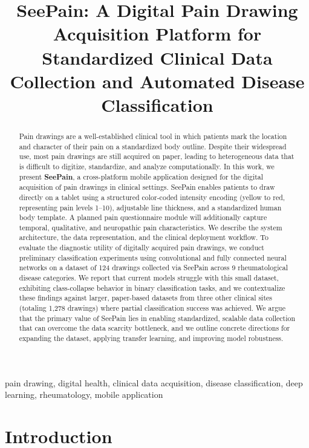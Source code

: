 \documentclass[conference]{IEEEtran}
\title{SeePain: A Digital Pain Drawing Acquisition Platform for Standardized Clinical Data Collection and Automated Disease Classification}
\author{
\IEEEauthorblockN{Raj Singh}
\IEEEauthorblockA{
}
\and
\IEEEauthorblockN{Kai Vahldiek}
\IEEEauthorblockA{
}
}
\begin{document}
\maketitle

\begin{abstract}
Pain drawings are a well-established clinical tool in which patients mark the location and character of their pain on a standardized body outline. Despite their widespread use, most pain drawings are still acquired on paper, leading to heterogeneous data that is difficult to digitize, standardize, and analyze computationally. In this work, we present \textbf{SeePain}, a cross-platform mobile application designed for the digital acquisition of pain drawings in clinical settings. SeePain enables patients to draw directly on a tablet using a structured color-coded intensity encoding (yellow to red, representing pain levels 1--10), adjustable line thickness, and a standardized human body template. A planned pain questionnaire module will additionally capture temporal, qualitative, and neuropathic pain characteristics. We describe the system architecture, the data representation, and the clinical deployment workflow. To evaluate the diagnostic utility of digitally acquired pain drawings, we conduct preliminary classification experiments using convolutional and fully connected neural networks on a dataset of 124 drawings collected via SeePain across 9 rheumatological disease categories. We report that current models struggle with this small dataset, exhibiting class-collapse behavior in binary classification tasks, and we contextualize these findings against larger, paper-based datasets from three other clinical sites (totaling 1,278 drawings) where partial classification success was achieved. We argue that the primary value of SeePain lies in enabling standardized, scalable data collection that can overcome the data scarcity bottleneck, and we outline concrete directions for expanding the dataset, applying transfer learning, and improving model robustness.
\end{abstract}

\begin{IEEEkeywords}
pain drawing, digital health, clinical data acquisition, disease classification, deep learning, rheumatology, mobile application
\end{IEEEkeywords}

\section{Introduction}
\label{sec:introduction}
\end{document}
